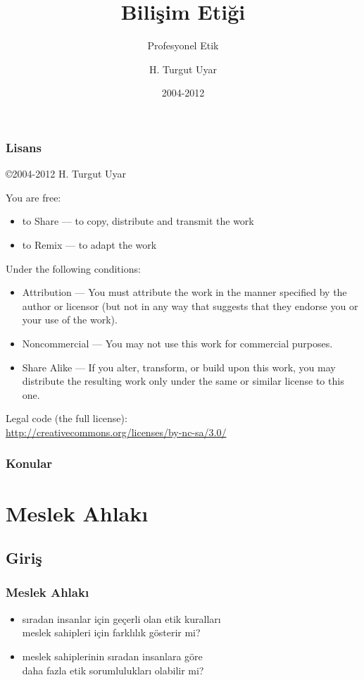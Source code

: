 \documentclass[dvipsnames]{beamer}
\title{Bilişim Etiği}
\subtitle{Profesyonel Etik}
\author{H. Turgut Uyar}
\date{2004-2012}
\theoremstyle{definition}
\theoremstyle{example}
\theoremstyle{plain}
\begin{document}
\begin{frame}
  \titlepage
\end{frame}

\begin{frame}
  \frametitle{Lisans}

  \hfill
  \copyright 2004-2012 H. Turgut Uyar

  \vfill
  \begin{tiny}
    You are free:
    \begin{itemize}
      \item to Share — to copy, distribute and transmit the work
      \item to Remix — to adapt the work
    \end{itemize}

    Under the following conditions:
    \begin{itemize}
      \item Attribution — You must attribute the work in the manner specified by
        the author or licensor (but not in any way that suggests that they
        endorse you or your use of the work).

      \item Noncommercial — You may not use this work for commercial purposes.

      \item Share Alike — If you alter, transform, or build upon this work, you
        may distribute the resulting work only under the same or similar license
        to this one.
    \end{itemize}
  \end{tiny}

  \vfill
  Legal code (the full license):\\
  \url{http://creativecommons.org/licenses/by-nc-sa/3.0/}
\end{frame}

\begin{frame}
  \frametitle{Konular}
  \tableofcontents
\end{frame}

\section{Meslek Ahlakı}

\subsection{Giriş}

\begin{frame}
  \frametitle{Meslek Ahlakı}

  \begin{itemize}
    \item sıradan insanlar için geçerli olan etik kuralları\\
      meslek sahipleri için farklılık gösterir mi?

    \item meslek sahiplerinin sıradan insanlara göre\\
      daha fazla etik sorumlulukları olabilir mi?
  \end{itemize}
\end{frame}
\end{document}
